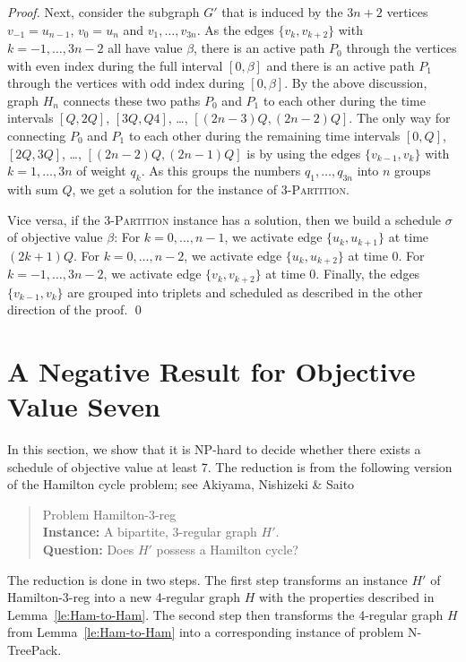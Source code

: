 \documentclass[runningheads]{llncs}
\newcommand{\set}[1]{\{ #1 \}}
\newcommand{\xxxNTP}{{\sc N-TreePack}}
\newcommand{\xxxHAM}{{\sc Hamilton-3-reg}}
\begin{document}
\begin{proof}
Next, consider the subgraph $G'$ that is induced by the $3n+2$ vertices $v_{-1}=u_{n-1}$, $v_0=u_n$ and 
$v_1,\ldots,v_{3n}$.
As the edges $\{v_k, v_{k+2}\}$ with $k=-1,\ldots,3n-2$ all have value $\beta$, there is an active path $P_0$ 
through the vertices with even index during the full interval $[0,\beta]$ and there is an active 
path $P_1$ through the vertices with odd index during $[0, \beta]$.
By the above discussion, graph $H_n$ connects these two paths $P_0$ and $P_1$ to each other during the
time intervals $[Q,2Q]$, $[3Q,Q4]$, \dots, $[(2n-3)Q,(2n-2)Q]$.
The only way for connecting $P_0$ and $P_1$ to each other during the remaining time intervals 
$[0,Q]$, $[2Q,3Q]$, \dots, $[(2n-2)Q,(2n-1)Q]$ is by using the edges $\{v_{k-1},v_k\}$ with $k=1,\ldots,3n$ of 
weight $q_k$.
As this groups the numbers $q_1,\ldots,q_{3n}$ into $n$ groups with sum $Q$, we get a solution
for the instance of \textsc{3-Partition}.

Vice versa, if the \textsc{3-Partition} instance has a solution, then we  build a schedule $\sigma$
of objective value $\beta$: For $k=0,\ldots,n-1$, we activate edge $\set{u_k, u_{k+1}}$ at time $(2k+1)Q$. For $k=0,\ldots,n-2$, we activate edge $\set{u_k, u_{k+2}}$ at time $0$. For $k=-1,\ldots,3n-2$, we activate edge $\set{v_k, v_{k+2}}$ at time $0$. Finally, the edges $\set{v_{k-1},v_k}$ are grouped into triplets and scheduled as described in the other direction of the proof.
\qed
\end{proof}


\section{A Negative Result for Objective Value Seven}
\label{sec:value-seven}
In this section, we show that it is NP-hard to decide whether there exists a schedule of objective value at least 7. 
The reduction is from the following version of the Hamilton cycle problem; 
see Akiyama, Nishizeki \& Saito \cite{hamilton3regularBip}
\begin{quote}
Problem {\xxxHAM}
\\
\textbf{Instance:} A bipartite, 3-regular graph $H'$.  
\\
\textbf{Question:} Does $H'$ possess a Hamilton cycle? 
\end{quote}
The reduction is done in two steps.
The first step transforms an instance $H'$ of {\xxxHAM} into a new 4-regular graph $H$ 
with the properties described in Lemma~\ref{le:Ham-to-Ham}.
The second step then transforms the 4-regular graph $H$ from Lemma~\ref{le:Ham-to-Ham}
into a corresponding instance of problem {\xxxNTP}.
\end{document}
